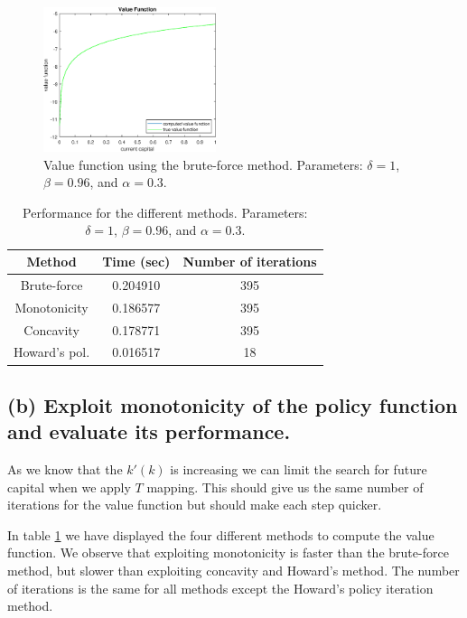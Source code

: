 \documentclass[12pt]{article}
\newcommand{\?}{\stackrel{?}{=}}
\begin{document}
\begin{figure}[htbp!]
    \centering
    \includegraphics[width=0.45\textwidth]{PS1/1_Value_function_without.eps}
    \caption{Value function using the brute-force method. Parameters: $\delta=1$, $\beta=0.96$, and $\alpha=0.3$.}
    \label{fig:val}
\end{figure}

\begin{table}[htbp!]
    \centering
    \begin{tabular}{c|c|c}
         Method & Time (sec) & Number of iterations \\
         \hline
         Brute-force & 0.204910 & 395 \\
         Monotonicity & 0.186577 & 395 \\
         Concavity & 0.178771 & 395 \\
         Howard's pol. & 0.016517 & 18
    \end{tabular}
    \caption{Performance for the different methods. Parameters: $\delta=1$, $\beta=0.96$, and $\alpha=0.3$.}
    \label{tab:res}
\end{table}

\subsection*{(b) Exploit monotonicity of the policy function and evaluate its performance.}

As we know that the $k'(k)$ is increasing we can limit the search for future capital when we apply $T$ mapping. This should give us the same number of iterations for the value function but should make each step quicker.

In table \ref{tab:res} we have displayed the four different methods to compute the value function. We observe that exploiting monotonicity is faster than the brute-force method, but slower than exploiting concavity and Howard's method. The number of iterations is the same for all methods except the Howard's policy iteration method.
\end{document}
